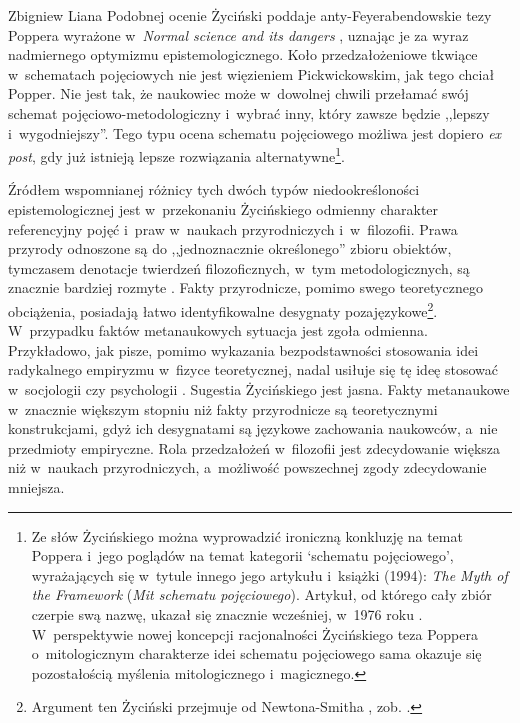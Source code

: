 \begin{artplenv}{Zbigniew Liana}
Podobnej ocenie Życiński
\parencites*[][s.~161n]{zycinski_teizm_1985}[][s.~140nn]{zycinski_structure_1988}[][s.~247nn]{zycinski_struktura_2013_liana} %
 poddaje anty-Feyerabendowskie tezy Poppera wyrażone w~\textit{Normal science and its dangers} 
\parencite*[][]{popper_normal_1970}, %
 uznając je za wyraz nadmiernego optymizmu epistemologicznego. Koło przedzałożeniowe tkwiące w~schematach pojęciowych nie jest więzieniem Pickwickowskim, jak tego chciał Popper. Nie jest tak, że naukowiec może w~dowolnej chwili przełamać swój schemat pojęciowo-metodologiczny i~wybrać inny, który zawsze będzie ,,lepszy i~wygodniejszy''. Tego typu ocena schematu pojęciowego możliwa jest dopiero \textit{ex post}, gdy już istnieją lepsze rozwiązania alternatywne\footnote{Ze słów Życińskiego można wyprowadzić ironiczną konkluzję na temat Poppera i~jego poglądów na temat kategorii ‘schematu pojęciowego', wyrażających się w~tytule innego jego artykułu i~książki (1994): \textit{The Myth of the Framework} (\textit{Mit schematu pojęciowego}). Artykuł, od którego cały zbiór czerpie swą nazwę, ukazał się znacznie wcześniej, w~1976 roku 
\parencite[zob.][s.~33]{popper_myth_1994}. %
 W~perspektywie nowej koncepcji racjonalności Życińskiego teza Poppera o~mitologicznym charakterze idei schematu pojęciowego sama okazuje się pozostałością myślenia mitologicznego i~magicznego.}.

Źródłem wspomnianej różnicy tych dwóch typów niedookreśloności epistemologicznej jest w~przekonaniu Życińskiego odmienny charakter referencyjny pojęć i~praw w~naukach przyrodniczych i~w~filo\-zofii. Prawa przyrody odnoszone są do ,,jednoznacznie określonego'' zbioru obiektów, tymczasem denotacje twierdzeń filozoficznych, w~tym metodologicznych, są znacznie bardziej rozmyte
\parencite[][s.~163]{zycinski_teizm_1985}. %
 Fakty przyrodnicze, pomimo swego teoretycznego obciążenia, posiadają łatwo identyfikowalne desygnaty pozajęzykowe\footnote{Argument ten Życiński przejmuje od Newtona-Smitha 
\parencite*[][s.~179]{newton-smith_rationality_1981}, %
 zob. 
\parencites[][s.~255]{zycinski_elementy_1996}[][s.~346]{zycinski_elementy_2015}.%
}. W~przypadku faktów metanaukowych sytuacja jest zgoła odmienna. Przykładowo, jak pisze, pomimo wykazania bezpodstawności stosowania idei radykalnego empiryzmu w~fizyce teoretycznej, nadal usiłuje się tę ideę stosować w~socjologii czy psychologii 
\parencite[][s.~163]{zycinski_teizm_1985}. %
 Sugestia Życińskiego jest jasna. Fakty metanaukowe w~znacznie większym stopniu niż fakty przyrodnicze są teoretycznymi konstrukcjami, gdyż ich desygnatami są językowe zachowania naukowców, a~nie przedmioty empiryczne. Rola przedzałożeń w~filozofii jest zdecydowanie większa niż w~naukach przyrodniczych, a~możliwość powszechnej zgody zdecydowanie mniejsza.


\end{artplenv}
